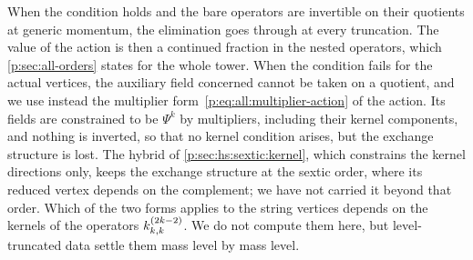 When the condition holds and the bare operators are invertible on their quotients at generic momentum, the elimination goes through at every truncation.
The value of the action is then a continued fraction in the nested operators, which \cref{p:sec:all-orders} states for the whole tower.
When the condition fails for the actual vertices, the auxiliary field concerned cannot be taken on a quotient, and we use instead the multiplier form~\eqref{p:eq:all:multiplier-action} of the action.
Its fields are constrained to be $\Psi^k$ by multipliers, including their kernel components, and nothing is inverted, so that no kernel condition arises, but the exchange structure is lost.
The hybrid of \cref{p:sec:hs:sextic:kernel}, which constrains the kernel directions only, keeps the exchange structure at the sextic order, where its reduced vertex depends on the complement; we have not carried it beyond that order.
Which of the two forms applies to the string vertices depends on the kernels of the operators $\kin{k}{}{2 k - 2}$.
We do not compute them here, but level-truncated data settle them mass level by mass level.
